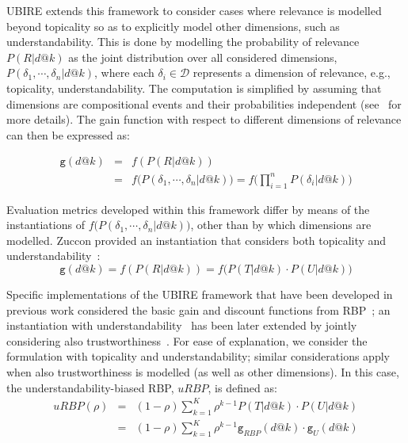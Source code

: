 UBIRE extends this framework to consider cases where relevance is modelled beyond topicality so as to explicitly model other dimensions, such as understandability.
This is done by modelling the probability of relevance $P(R|d@k)$ as the joint distribution over all considered dimensions, $P(\delta_1, \cdots, \delta_n|d@k)$, where each $\delta_i \in \mathcal{D}$ represents a dimension of relevance, e.g., topicality, understandability. The computation is simplified by assuming that dimensions are compositional events and their probabilities independent (see~\cite{zuccon16} for more details). The gain function with respect to different dimensions of relevance can then be expressed as:

\begin{eqnarray*}
    \mathtt{g}(d@k) &=& f(P(R|d@k)) \\
    &=& f\big(P(\delta_1, \cdots, \delta_n|d@k)\big) = f\Big(\prod_{i=1}^n P(\delta_i|d@k)\Big) 
\end{eqnarray*}


Evaluation metrics developed within this framework differ by means of the instantiations of $f\big(P(\delta_1, \cdots, \delta_n|d@k)\big)$, other than by which dimensions are modelled. Zuccon provided an instantiation that considers both topicality and understandability~\cite{zuccon16}:
%
\vspace{-4pt}
\begin{equation*}
\mathtt{g}(d@k) = f(P(R|d@k)) = f\big(P(T|d@k) \cdot P(U|d@k)\big)
\end{equation*}

Specific implementations of the UBIRE framework that have been developed in previous work considered the basic gain and discount functions from RBP~\cite{moffat08}; an instantiation with understandability~\cite{zuccon14,zuccon16} has been later extended by jointly considering also trustworthiness~\cite{clefIR17}. For ease of explanation, we consider the formulation with topicality and understandability; similar considerations apply when also trustworthiness is modelled (as well as other dimensions). In this case, the understandability-biased RBP, $uRBP$, is defined as: 
%
\begin{eqnarray*}
    uRBP(\rho) &=& (1-\rho) \sum_{k=1}^{K} \rho^{k-1} P(T|d@k) \cdot P(U|d@k)\\ 
&=& (1-\rho) \sum_{k=1}^{K} \rho^{k-1} \mathtt{g}_{RBP}(d@k) \cdot \mathtt{g}_{U}(d@k)
\label{eq:RBP}
\end{eqnarray*}

